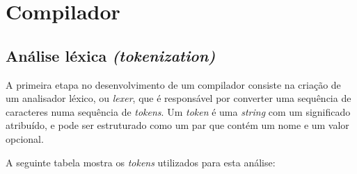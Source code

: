 
\chapter{Compilador} %

\label{Chapter4} %

\section{Análise léxica \textit{(tokenization)}}
A primeira etapa no desenvolvimento de um compilador consiste na criação de um analisador léxico, ou \textit{lexer}, que é responsável por converter uma sequência de caracteres numa sequência de \textit{tokens}.
Um \textit{token} é uma \textit{string} com um significado atribuído, e pode ser estruturado como um par que contém um nome e um valor opcional.

A seguinte tabela mostra os \textit{tokens} utilizados para esta análise:


